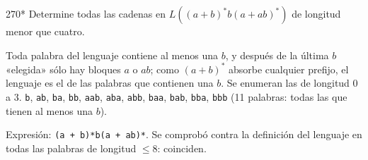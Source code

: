 \documentclass[11pt]{article}
\begin{document}
\begin{ejercicio}{270}{*}
Determine todas las cadenas en $L((a + b)^*b(a + ab)^*)$ de longitud menor que cuatro.
\end{ejercicio}
\proc Toda palabra del lenguaje contiene al menos una $b$, y después de la última $b$ «elegida» sólo hay bloques $a$ o $ab$; como $(a + b)^*$ absorbe cualquier prefijo, el lenguaje es el de las palabras que contienen una $b$. Se enumeran las de longitud 0 a 3.
\resp \texttt{b}, \texttt{ab}, \texttt{ba}, \texttt{bb}, \texttt{aab}, \texttt{aba}, \texttt{abb}, \texttt{baa}, \texttt{bab}, \texttt{bba}, \texttt{bbb} (11 palabras: todas las que tienen al menos una $b$).\par Expresión: \texttt{(a + b)*b(a + ab)*}. Se comprobó contra la definición del lenguaje en todas las palabras de longitud $\le 8$: coinciden.
\end{document}
